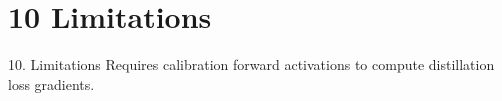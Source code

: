 \section{10 Limitations}

 10. Limitations
Requires calibration forward activations to compute distillation loss gradients.
